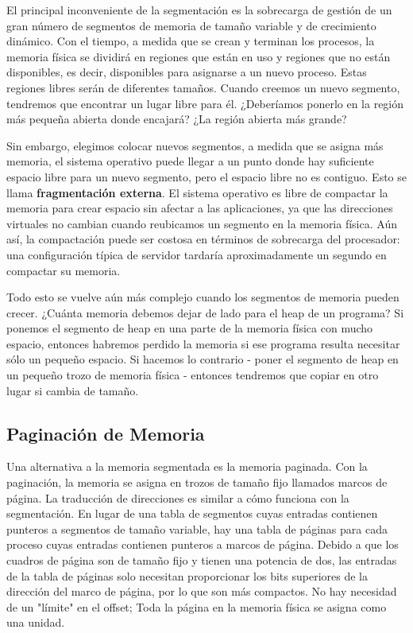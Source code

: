 \documentclass[10pt]{book}
\begin{document}
El principal inconveniente de la segmentación es la sobrecarga de gestión de un gran número de segmentos de memoria de tamaño variable y de crecimiento dinámico. Con el tiempo, a medida que se crean y terminan los procesos, la memoria física se dividirá en regiones que están en uso y regiones que no están disponibles, es decir, disponibles para asignarse a un nuevo proceso. Estas regiones libres serán de diferentes tamaños. Cuando creemos un nuevo segmento, tendremos que encontrar un lugar libre para él. ¿Deberíamos ponerlo en la región más pequeña abierta donde encajará? ¿La región abierta más grande?

Sin embargo, elegimos colocar nuevos segmentos, a medida que se asigna más memoria, el sistema operativo puede llegar a un punto donde hay suficiente espacio libre para un nuevo segmento, pero el espacio libre no es contiguo. Esto se llama \textbf{fragmentación externa}. El sistema operativo es libre de compactar la memoria para crear espacio sin afectar a las aplicaciones, ya que las direcciones virtuales no cambian cuando reubicamos un segmento en la memoria física. Aún así, la compactación puede ser costosa en términos de sobrecarga del procesador: una configuración típica de servidor tardaría aproximadamente un segundo en compactar su memoria.

Todo esto se vuelve aún más complejo cuando los segmentos de memoria pueden crecer. ¿Cuánta memoria debemos dejar de lado para el heap de un programa? Si ponemos el segmento de heap en una parte de la memoria física con mucho espacio, entonces habremos perdido la memoria si ese programa resulta necesitar sólo un pequeño espacio. Si hacemos lo contrario - poner el segmento de heap en un pequeño trozo de memoria física - entonces tendremos que copiar en otro lugar si cambia de tamaño.

\subsection{Paginación de Memoria}
Una alternativa a la memoria segmentada es la memoria paginada. Con la paginación, la memoria se asigna en trozos de tamaño fijo llamados marcos de página. La traducción de direcciones es similar a cómo funciona con la segmentación. En lugar de una tabla de segmentos cuyas entradas contienen punteros a segmentos de tamaño variable, hay una tabla de páginas para cada proceso cuyas entradas contienen punteros a marcos de página. Debido a que los cuadros de página son de tamaño fijo y tienen una potencia de dos, las entradas de la tabla de páginas solo necesitan proporcionar los bits superiores de la dirección del marco de página, por lo que son más compactos. No hay necesidad de un "límite" en el offset; Toda la página en la memoria física se asigna como una unidad. 
\end{document}
